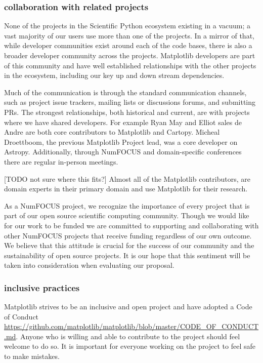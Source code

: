 \documentclass[12pt]{article}
\numberwithin{page}{section}
\begin{document}
\subsubsection{collaboration with related projects}

None of the projects in the Scientific Python ecosystem existing in a
vacuum; a vast majority of our users use more than one of the
projects.  In a mirror of that, while developer communities exist
around each of the code bases, there is also a broader developer
community across the projects.  Matplotlib developers are part of this
community and have well established relationships with the other
projects in the ecosystem, including our key up and down stream
dependencies.

Much of the communication is through the standard communication
channels, such as project issue trackers, mailing lists or discussions
forums, and submitting PRs.  The strongest relationships, both
historical and current, are with projects where we have shared
developers.  For example Ryan May and Elliot sales de Andre are both
core contributors to Matplotlib and Cartopy.  Micheal Droettboom, the
previous Matplotlib Project lead, was a core developer on Astropy.
Additionally, through NumFOCUS and domain-specific conferences there
are regular in-person meetings.

[TODO not sure where this fits?] Almost all of the Matplotlib
contributors, are domain experts in their primary domain and use
Matplotlib for their research.


As a NumFOCUS project, we recognize the importance of every project
that is part of our open source scientific computing community. Though
we would like for our work to be funded we are committed to supporting
and collaborating with other NumFOCUS projects that receive funding
regardless of our own outcome. We believe that this attitude is
crucial for the success of our community and the sustainability of
open source projects. It is our hope that this sentiment will be taken
into consideration when evaluating our proposal.


\subsubsection{inclusive practices}

Matplotlib strives to be an inclusive and open project and have
adopted a Code of Conduct
\url{https://github.com/matplotlib/matplotlib/blob/master/CODE_OF_CONDUCT.md}. Anyone
who is willing and able to contribute to the project should feel
welcome to do so.  It is important for everyone working on the project
to feel safe to make mistakes.
\end{document}
